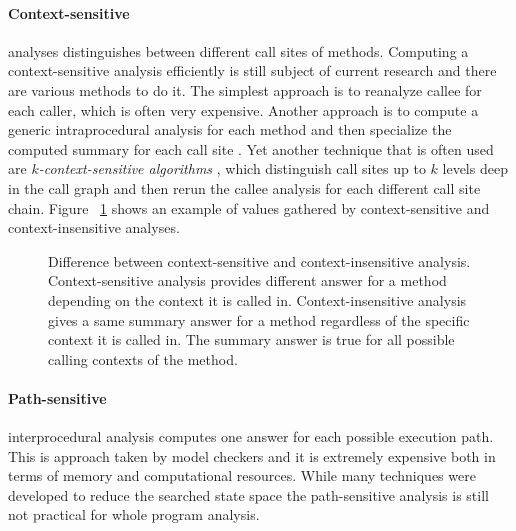 \paragraph{Context-sensitive} analyses distinguishes between different call sites of methods. Computing a context-sensitive analysis efficiently is still subject of current research and there are various methods to do it. The simplest approach is to reanalyze callee for each caller, which is often very expensive. Another approach is to compute a generic intraprocedural analysis for each method and then specialize the computed summary for each call site \citep{Gulwani2007}. Yet another technique that is often used are \emph{$k$-context-sensitive algorithms} \citep{Shivers1991,Might2007}, which distinguish call sites up to $k$ levels deep in the call graph and then rerun the callee analysis for each different call site chain. Figure ~\ref{fig:contextSensitivity} shows an example of values gathered by context-sensitive and context-insensitive analyses.

\begin{figure}
\begin{center}
\caption{Difference between context-sensitive and context-insensitive analysis. Context-sensitive analysis provides different answer for a method depending on the context it is called in. Context-insensitive analysis gives a same summary answer for a method regardless of the specific context it is called in. The summary answer is true for all possible calling contexts of the method.}
\label{fig:contextSensitivity}
\end{center}
\end{figure}

\paragraph{Path-sensitive} interprocedural analysis computes one answer for each possible execution path. This is approach taken by model checkers and it is extremely expensive both in terms of memory and computational resources. While many techniques were developed to reduce the searched state space the path-sensitive analysis is still not practical for whole program analysis.

